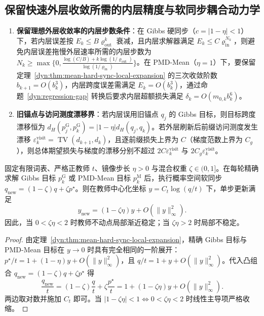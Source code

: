 \documentclass[lang=cn,scheme=chinese,openany]{elegantbook}
\newcommand{\TV}{\operatorname{TV}}
\begin{document}
\subsection{保留快速外层收敛所需的内层精度与软同步耦合动力学}

\begin{enumerate}
\item \textbf{保留理想外层收敛率的内层步数条件}：在 Gibbs 硬同步（$c=|1-\eta|<1$）下，若内层误差按 $E_k\le B\varrho_{\mathrm{out}}^k$ 衰减，且内层求解器满足 $E_k\le C\varrho_{\mathrm{in}}^{N_k}$，则避免内层误差拖慢外层速率所需的内层步数为 $N_k\ge\max\bigl\{0,\frac{\log(C/B)+k\log(1/\varrho_{\mathrm{out}})}{\log(1/\varrho_{\mathrm{in}})}\bigr\}$。在 PMD-Mean（$\eta=1$）下，要保留定理~\ref{dyn:thm:mean-hard-sync-local-expansion} 的三次收敛阶数 $b_{k+1}=O(b_k^3)$，内层跨度误差需满足 $E_k=O(b_k^3)$，通过命题~\ref{dyn:regression-gap} 转换后要求内层超额损失满足 $\delta_k=O(m_{0,k}b_k^6)$。
\item \textbf{旧锚点与访问测度漂移界}：若内层误用旧锚点 $q_j$ 的 Gibbs 目标，则目标跨度漂移恒为 $d_H(p_j^{\mathrm G},p_k^{\mathrm G})=|1-\eta|d_H(q_j,q_k)$。若外层刷新后前缀访问测度发生漂移 $\varepsilon_k^{\mathrm{visit}}=\TV(d_{k+1},d_k)$，且逐前缀损失上界为 $C$（梯度范数上界为 $C_g$），则总体期望损失与梯度的漂移分别不超过 $2C\varepsilon_k^{\mathrm{visit}}$ 与 $2C_g\varepsilon_k^{\mathrm{visit}}$。
\end{enumerate}

\begin{proposition}
\label{dyn:soft-local}
固定有限词表、严格正教师 $t$、镜像步长 $\eta>0$ 与混合权重 $\zeta\in(0,1]$。在每轮精确求解 Gibbs 目标 $p_k^{\mathrm G}$ 或 PMD-Mean 目标 $p_k^{\mathrm M}$ 后，执行概率空间软同步 $q_{\mathrm{new}}=(1-\zeta)q+\zeta p^\star$。则在教师中心化坐标 $y=C_t\log(q/t)$ 下，单步更新满足
\begin{equation}
y_{\mathrm{new}}=(1-\zeta\eta)y+O(\|y\|_\infty^2).
\end{equation}
因此，当 $0<\zeta\eta<2$ 时教师不动点局部渐近稳定；当 $\zeta\eta>2$ 时局部不稳定。
\end{proposition}
\begin{proof}
由定理~\ref{dyn:thm:mean-hard-sync-local-expansion}，精确 Gibbs 目标与 PMD-Mean 目标在 $y\to 0$ 时具有完全相同的一阶展开：$p^\star/t=1+(1-\eta)y+O(\|y\|_\infty^2)$，且 $q/t=1+y+O(\|y\|_\infty^2)$。代入凸组合 $q_{\mathrm{new}}=(1-\zeta)q+\zeta p^\star$ 得
\begin{equation*}
\frac{q_{\mathrm{new}}}{t}
=(1-\zeta)\frac qt+\zeta\frac{p^\star}t
=1+(1-\zeta\eta)y+O(\|y\|_\infty^2).
\end{equation*}
两边取对数并施加 $C_t$ 即可。当 $|1-\zeta\eta|<1\Longleftrightarrow 0<\zeta\eta<2$ 时线性主导项严格收缩。
\end{proof}
\end{document}

